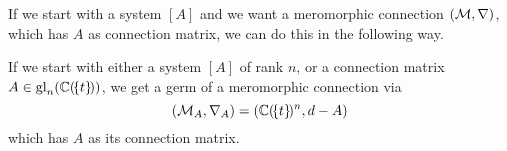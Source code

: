 
If we start with a system $[A]$ and we want a meromorphic connection
$(\mathcal{M},\nabla)$, which has $A$ as connection matrix, we can do this in the
following way.
\begin{prop}\label{prop:systToMeromConn}
  If we start with either a system $[A]$ of rank $n$, or a connection matrix
  $A\in\operatorname{gl}_n(\mathbb{C}(\!\{t\}\!))$, we get a germ of a meromorphic connection via
  \[
    (\mathcal{M}_A,\nabla_A)=(\mathbb{C}(\!\{t\}\!)^n,d-A)
  \]
  which has $A$ as its connection matrix.
  \TODO[cf??]
\end{prop}
\begin{comment}
  \begin{proof}
    \TODO{}
  \end{proof}
\end{comment}

